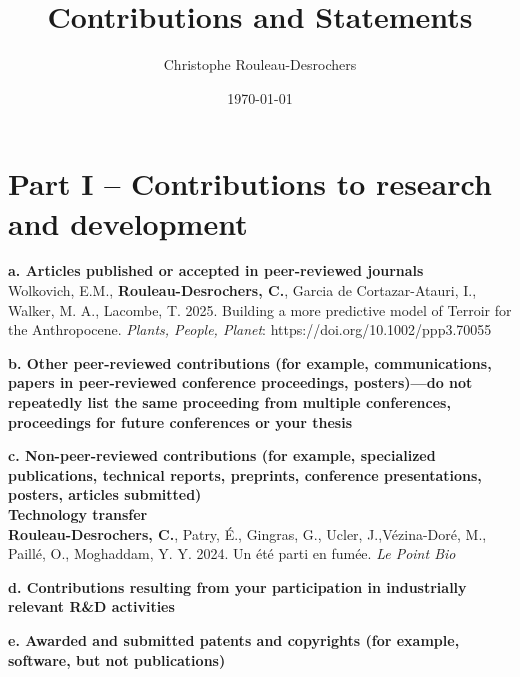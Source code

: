 \documentclass{article}
\title{Contributions and Statements}
\date{\today}
\author{Christophe Rouleau-Desrochers}
\begin{document}

\maketitle

\section*{Part I – Contributions to research and development}
\par
\textbf{a. Articles published or accepted in peer-reviewed journals} \\
Wolkovich, E.M., \textbf{Rouleau-Desrochers, C.}, Garcia de Cortazar-Atauri, I., Walker, M. A., Lacombe,
T. 2025. Building a more predictive model of Terroir for the Anthropocene. \textit{Plants, People, Planet}: https://doi.org/10.1002/ppp3.70055 \\
\par
\textbf{b. Other peer-reviewed contributions (for example, communications, papers in peer-reviewed conference proceedings, posters)—do not repeatedly list the same proceeding from multiple conferences, proceedings for future conferences or your thesis} \\
\par
\textbf{c. Non-peer-reviewed contributions (for example, specialized publications, technical reports, preprints, conference presentations, posters, articles submitted) \\
Technology transfer} \\ 
\textbf{Rouleau-Desrochers, C.}, Patry, É., Gingras, G., Ucler, J.,Vézina-Doré, M., Paillé, O., Moghaddam, Y. Y. 2024. Un été parti en fumée. \textit{Le Point Bio}
\par
\textbf{d. Contributions resulting from your participation in industrially relevant R\&D activities} \\ 
\par
\textbf{e. Awarded and submitted patents and copyrights (for example, software, but not publications)}
\end{document}
